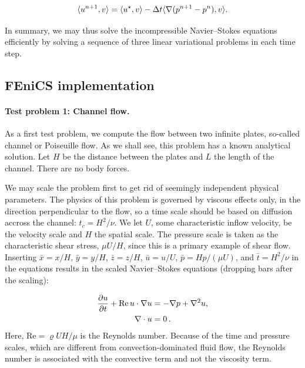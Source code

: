 \documentclass[graybox,envcountchap,sectrefs,final]{svmonodo}
\begin{document}
\begin{equation}
\label{ftut1:ipcs3}
  \langle {u^{n+1}},{v} \rangle
  =
  \langle {u^{\star}},{v} \rangle
  - \Delta t \langle {\nabla(p^{n+1}-p^{n})},{v} \rangle.
\end{equation}

In summary, we may thus solve the incompressible Navier--Stokes
equations efficiently by solving a sequence of three linear variational
problems in each time step.

\subsection{FEniCS implementation}

\paragraph{Test problem 1: Channel flow.}

As a first test problem, we compute the flow between two infinite
plates, so-called channel or Poiseuille flow. As we shall see, this
problem has a known analytical solution. Let $H$ be the distance
between the plates and $L$ the length of the channel. There are no
body forces.


We may scale the problem first to get rid of seemingly independent
physical parameters. The physics of this problem is governed by
viscous effects only, in the direction perpendicular to the flow, so a
time scale should be based on diffusion accross the channel: $t_c =
H^2/\nu$. We let $U$, some characteristic inflow velocity, be the
velocity scale and $H$ the spatial scale. The pressure scale is taken
as the characteristic shear stress, $\mu U/H$, since this is a primary
example of shear flow.  Inserting $\bar x = x/H$, $\bar y = y/H$,
$\bar z = z/H$, $\bar u =u/U$, $\bar p = Hp/(\mu U)$, and $\bar t =
H^2/\nu$ in the equations results in the scaled Navier--Stokes
equations (dropping bars after the scaling):


\begin{align*}
\frac{\partial u}{\partial t} + \mathrm{Re}\, u\cdot\nabla u
&= -\nabla p + \nabla^2 u,\\
\nabla\cdot u &= 0\thinspace .
\end{align*}
Here, $\mathrm{Re} = \varrho UH/\mu$ is the Reynolds number. Because
of the time and pressure scales, which are different from
convection-dominated fluid flow, the Reynolds number is associated
with the convective term and not the viscosity term.
\end{document}
